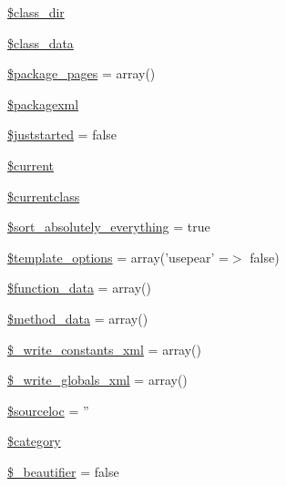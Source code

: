 \begin{DoxyCompactItemize}
\hyperlink{class_x_m_l_doc_bookpeardoc2_converter_aaeaa82d379050faafbb4bf4b82733c94}{\$class\-\_\-dir}
\item 
\hyperlink{class_x_m_l_doc_bookpeardoc2_converter_afdb3770ba45b6d4db2c00c8c18832482}{\$class\-\_\-data}
\item 
\hyperlink{class_x_m_l_doc_bookpeardoc2_converter_acb916db0304b969918dbc0de762d45e0}{\$package\-\_\-pages} = array()
\item 
\hyperlink{class_x_m_l_doc_bookpeardoc2_converter_a0992acf5feecf128a12c3754ab95e85a}{\$packagexml}
\item 
\hyperlink{class_x_m_l_doc_bookpeardoc2_converter_acb00e2d25525278b0592bfffe53bc4b6}{\$juststarted} = false
\item 
\hyperlink{class_x_m_l_doc_bookpeardoc2_converter_a2c4c58e377f6c66ca38c8ea97666fc5e}{\$current}
\item 
\hyperlink{class_x_m_l_doc_bookpeardoc2_converter_a14f3ccc5fc24cdb94ee022a77ef69c4d}{\$currentclass}
\item 
\hyperlink{class_x_m_l_doc_bookpeardoc2_converter_a40eea215f3b8eaec5c134f45f62aa100}{\$sort\-\_\-absolutely\-\_\-everything} = true
\item 
\hyperlink{class_x_m_l_doc_bookpeardoc2_converter_a9e8e3182b20bb595bfe9186d97b57bb2}{\$template\-\_\-options} = array('usepear' =$>$ false)
\item 
\hyperlink{class_x_m_l_doc_bookpeardoc2_converter_abbfa657ff6e0d3c42caa2576e218ebea}{\$function\-\_\-data} = array()
\item 
\hyperlink{class_x_m_l_doc_bookpeardoc2_converter_a6ce6f073a68c637ae7f1eee6fd484090}{\$method\-\_\-data} = array()
\item 
\hyperlink{class_x_m_l_doc_bookpeardoc2_converter_a7988ee9d63a1a32fb5a4615c73327537}{\$\-\_\-write\-\_\-constants\-\_\-xml} = array()
\item 
\hyperlink{class_x_m_l_doc_bookpeardoc2_converter_af783d34112aa526905e154975776e5a5}{\$\-\_\-write\-\_\-globals\-\_\-xml} = array()
\item 
\hyperlink{class_x_m_l_doc_bookpeardoc2_converter_a9658cd0f27d80c5ba9b9c7d3b9ba4609}{\$sourceloc} = ''
\item 
\hyperlink{class_x_m_l_doc_bookpeardoc2_converter_a18b2a8d133fa7733bf34abcc6ca2ef5b}{\$category}
\item 
\hyperlink{class_x_m_l_doc_bookpeardoc2_converter_a18b67ff3d47ad105041ee3956857fa14}{\$\-\_\-beautifier} = false
\end{DoxyCompactItemize}


